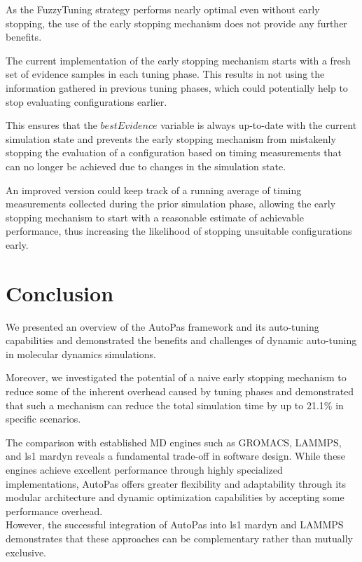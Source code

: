 \documentclass[conference]{IEEEtran}
\begin{document}
\begin{description}[leftmargin=1.2em, font=\itshape, style=nextline]
        As the FuzzyTuning strategy performs nearly optimal even without early stopping, the use of the early stopping mechanism does not provide any further benefits.

    \item[Limitations and Future Work:]
        The current implementation of the early stopping mechanism starts with a fresh set of evidence samples in each tuning phase. This results in not using the information gathered in previous tuning phases, which could potentially help to stop evaluating configurations earlier.

        This ensures that the $bestEvidence$ variable is always up-to-date with the current simulation state and prevents the early stopping mechanism from mistakenly stopping the evaluation of a configuration based on timing measurements that can no longer be achieved due to changes in the simulation state.

        An improved version could keep track of a running average of timing measurements collected during the prior simulation phase, allowing the early stopping mechanism to start with a reasonable estimate of achievable performance, thus increasing the likelihood of stopping unsuitable configurations early.
\end{description}

\section{Conclusion}

We presented an overview of the AutoPas framework and its auto-tuning capabilities and demonstrated the benefits and challenges of dynamic auto-tuning in molecular dynamics simulations.

Moreover, we investigated the potential of a naive early stopping mechanism to reduce some of the inherent overhead caused by tuning phases and demonstrated that such a mechanism can reduce the total simulation time by up to 21.1\% in specific scenarios.

The comparison with established MD engines such as GROMACS, LAMMPS, and ls1 mardyn reveals a fundamental trade-off in software design. While these engines achieve excellent performance through highly specialized implementations, AutoPas offers greater flexibility and adaptability through its modular architecture and dynamic optimization capabilities by accepting some performance overhead.\\
However, the successful integration of AutoPas into ls1 mardyn and LAMMPS demonstrates that these approaches can be complementary rather than mutually exclusive.

\newpage



\end{document}

